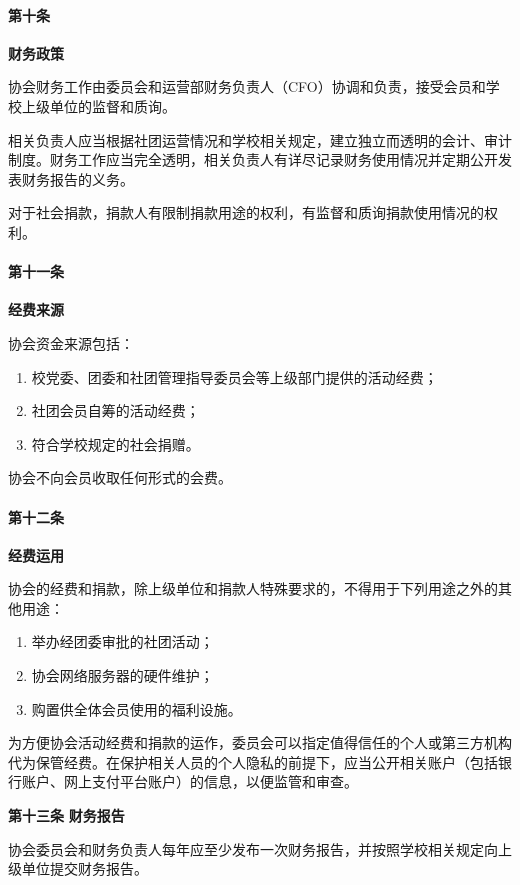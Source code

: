\documentclass[a4paper, 12pt, twoside]{ctexart}
\begin{document}
	\paragraph{第十条} \textbf{财务政策}
	
	协会财务工作由委员会和运营部财务负责人（CFO）协调和负责，接受会员和学校上级单位的监督和质询。
	
	相关负责人应当根据社团运营情况和学校相关规定，建立独立而透明的会计、审计制度。财务工作应当完全透明，相关负责人有详尽记录财务使用情况并定期公开发表财务报告的义务。
	
	对于社会捐款，捐款人有限制捐款用途的权利，有监督和质询捐款使用情况的权利。
	
	\paragraph{第十一条} \textbf{经费来源}
	
	协会资金来源包括：
	
	\begin{enumerate}
		\item 校党委、团委和社团管理指导委员会等上级部门提供的活动经费；
		\item 社团会员自筹的活动经费；
		\item 符合学校规定的社会捐赠。
	\end{enumerate}
	
	协会不向会员收取任何形式的会费。
	
	\paragraph{第十二条} \textbf{经费运用}
	
	协会的经费和捐款，除上级单位和捐款人特殊要求的，不得用于下列用途之外的其他用途：
	
	\begin{enumerate}
		\item 举办经团委审批的社团活动；
		\item 协会网络服务器的硬件维护；
		\item 购置供全体会员使用的福利设施。
	\end{enumerate}
	
	为方便协会活动经费和捐款的运作，委员会可以指定值得信任的个人或第三方机构代为保管经费。在保护相关人员的个人隐私的前提下，应当公开相关账户（包括银行账户、网上支付平台账户）的信息，以便监管和审查。
	
	\textbf{第十三条} \textbf{财务报告}
	
	协会委员会和财务负责人每年应至少发布一次财务报告，并按照学校相关规定向上级单位提交财务报告。
	
\end{document}
